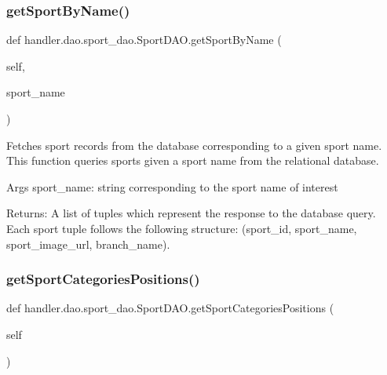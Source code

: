 \subsubsection{\texorpdfstring{get\+Sport\+By\+Name()}{getSportByName()}}
{\footnotesize\ttfamily def handler.\+dao.\+sport\+\_\+dao.\+Sport\+D\+A\+O.\+get\+Sport\+By\+Name (\begin{DoxyParamCaption}\item[{}]{self,  }\item[{}]{sport\+\_\+name }\end{DoxyParamCaption})}

\begin{DoxyVerb}Fetches sport records from the database corresponding to a given sport name.
This function queries sports given a sport name from the relational database.

Args
    sport_name: string corresponding to the sport name of interest

Returns:
    A list of tuples which represent the response to the database query.
    Each sport tuple follows the following structure:
(sport_id, sport_name, sport_image_url, branch_name).
\end{DoxyVerb}
 \mbox{\label{classhandler_1_1dao_1_1sport__dao_1_1_sport_d_a_o_a89205e68760e86f6a349a98ed49798d4}} 
\subsubsection{\texorpdfstring{get\+Sport\+Categories\+Positions()}{getSportCategoriesPositions()}}
{\footnotesize\ttfamily def handler.\+dao.\+sport\+\_\+dao.\+Sport\+D\+A\+O.\+get\+Sport\+Categories\+Positions (\begin{DoxyParamCaption}\item[{}]{self }\end{DoxyParamCaption})}

